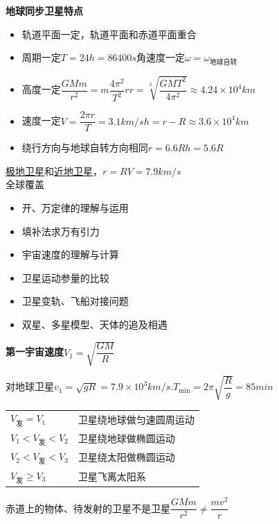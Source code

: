 \textbf{地球同步卫星特点}
\begin{itemize}
  \item 轨道平面一定，轨道平面和赤道平面重合
  \item 周期一定\quad $T=24\unit{h}=86400\unit{s}$\quad 角速度一定\quad $\omega=\omega_{\text{地球自转}}$
  \item 高度一定\quad $\dfrac{GMm}{r^2}=m\dfrac{4\pi^2}{T^2}r$\quad $r=\sqrt[3]{\dfrac{GMT^2}{4\pi^2}}\approx4.24\times10^4\unit{km}$
  \item 速度一定\quad $V=\dfrac{2\pi r}{T}=3.1\unit{km/s}$\quad $h=r-R\approx3.6\times10^4\unit{km}$
  \item 绕行方向与地球自转方向相同\quad $r=6.6R$\quad $h=5.6R$
\end{itemize}

\underline{极地卫星}和\underline{近地卫星}，\quad $r=R$\quad $V=7.9\unit{km/s}$\\
全球覆盖 %

\begin{itemize}
  \item 开、万定律的理解与运用
  \item 填补法求万有引力
  \item 宇宙速度的理解与计算
  \item 卫星运动参量的比较
  \item 卫星变轨、飞船对接问题
  \item 双星、多星模型、天体的追及相遇 %
\end{itemize}
\textbf{第一宇宙速度}\quad $V_1=\sqrt{\dfrac{GM}{R}}$

对地球卫星\quad $v_1=\sqrt{gR}=7.9\times10^{3}\unit{km/s}$.\quad $T_{\min}=2\pi\sqrt{\dfrac{R}{g}}=85\unit{min}$ %

\medskip
\begin{tabular}{@{}ll@{}}
$V_{\text{发}}=V_1$ & 卫星绕地球做匀速圆周运动 \\
$V_1<V_{\text{发}}<V_2$ & 卫星绕地球做椭圆运动 \\
$V_2<V_{\text{发}}<V_3$ & 卫星绕太阳做椭圆运动 \\
$V_{\text{发}}\ge V_3$ & 卫星飞离太阳系 \\
\end{tabular}
赤道上的物体、待发射的卫星不是卫星\quad $\dfrac{GMm}{r^{2}}\neq\dfrac{mv^{2}}{r}$

